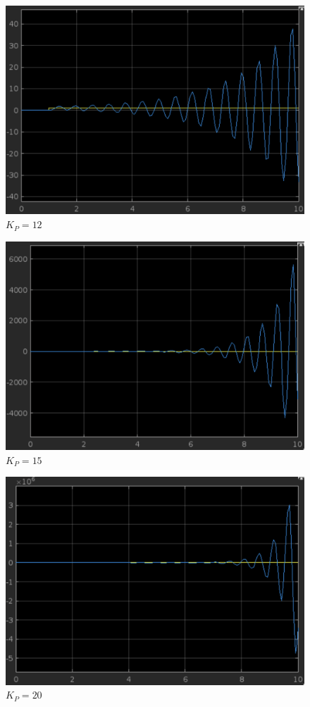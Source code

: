 \documentclass{article}
\begin{document}
\newpage
				\begin{figure}[h]
					\includegraphics[scale=0.225, center]{2_c_KP_12.png}
					\caption{$K_P = 12$}
					\label{fig27: Graph_c_KP_12}
				\end{figure}				
				\begin{figure}[h]
					\includegraphics[scale=0.225, center]{2_c_KP_15.png}
					\caption{$K_P = 15$}
					\label{fig28: Graph_c_KP_15}
				\end{figure}	
\newpage
				\begin{figure}[h]
					\includegraphics[scale=0.225, center]{2_c_KP_20.png}
					\caption{$K_P = 20$}
					\label{fig29: Graph_c_KP_20}
				\end{figure}				
\end{document}
